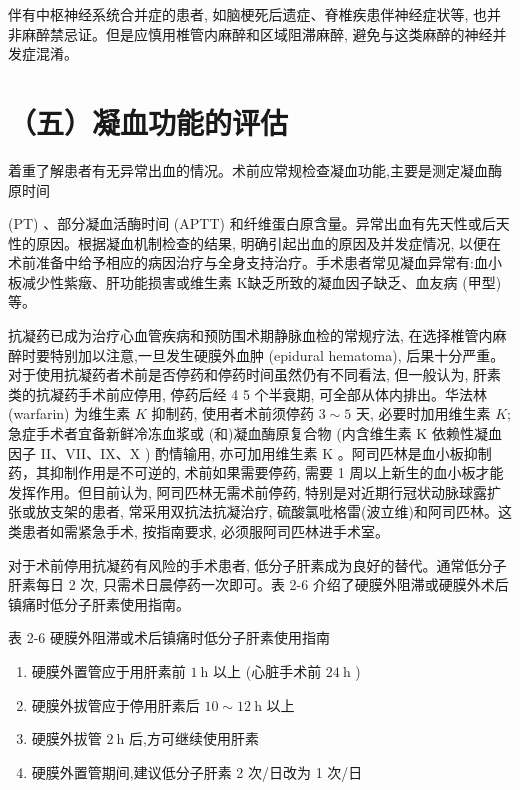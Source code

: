 \documentclass[10pt]{article}
\begin{document}
伴有中枢神经系统合并症的患者, 如脑梗死后遗症、脊椎疾患伴神经症状等, 也并非麻醉禁忌证。但是应慎用椎管内麻醉和区域阻滞麻醉, 避免与这类麻醉的神经并发症混淆。

\section*{（五）凝血功能的评估}
着重了解患者有无异常出血的情况。术前应常规检查凝血功能,主要是测定凝血酶原时间

(PT) 、部分凝血活酶时间 (APTT) 和纤维蛋白原含量。异常出血有先天性或后天性的原因。根据凝血机制检查的结果, 明确引起出血的原因及并发症情况, 以便在术前准备中给予相应的病因治疗与全身支持治疗。手术患者常见凝血异常有:血小板减少性紫㿂、肝功能损害或维生素 $\mathrm{K}$缺乏所致的凝血因子缺乏、血友病 (甲型) 等。

抗凝药已成为治疗心血管疾病和预防围术期静脉血检的常规疗法, 在选择椎管内麻醉时要特别加以注意,一旦发生硬膜外血肿 (epidural hematoma), 后果十分严重。对于使用抗凝药者术前是否停药和停药时间虽然仍有不同看法, 但一般认为, 肝素类的抗凝药手术前应停用, 停药后经 4 5 个半衰期, 可全部从体内排出。华法林 (warfarin) 为维生素 $K$ 抑制药, 使用者术前须停药 $3 \sim 5$ 天, 必要时加用维生素 $K$; 急症手术者宜备新鲜冷冻血浆或 (和)凝血酶原复合物 (内含维生素 K 依赖性凝血因子 II、VII、IX、X ) 酌情输用, 亦可加用维生素 $\mathrm{K}$ 。阿司匹林是血小板抑制药，其抑制作用是不可逆的, 术前如果需要停药, 需要 1 周以上新生的血小板才能发挥作用。但目前认为, 阿司匹林无需术前停药, 特别是对近期行冠状动脉球露扩张或放支架的患者, 常采用双抗法抗凝治疗, 硫酸氯吡格雷(波立维)和阿司匹林。这类患者如需紧急手术, 按指南要求, 必须服阿司匹林进手术室。

对于术前停用抗凝药有风险的手术患者, 低分子肝素成为良好的替代。通常低分子肝素每日 2 次, 只需术日晨停药一次即可。表 2-6 介绍了硬膜外阻滞或硬膜外术后镇痛时低分子肝素使用指南。

表 2-6 硬膜外阻滞或术后镇痛时低分子肝素使用指南

\begin{enumerate}
  \item 硬膜外置管应于用肝素前 $1 \mathrm{~h}$ 以上 (心脏手术前 $24 \mathrm{~h}$ )

  \item 硬膜外拔管应于停用肝素后 $10 \sim 12 \mathrm{~h}$ 以上

  \item 硬膜外拔管 $2 \mathrm{~h}$ 后,方可继续使用肝素

  \item 硬膜外置管期间,建议低分子肝素 2 次/日改为 1 次/日

\end{enumerate}
\end{document}

